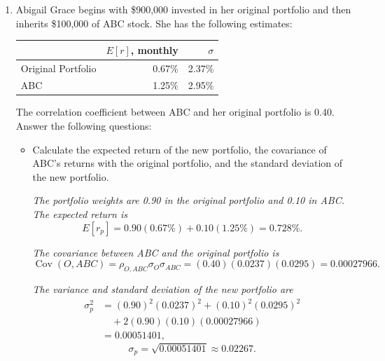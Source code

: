 \documentclass[11pt]{article}
\theoremstyle{definition}
\begin{document}
    \begin{shaded}

        \begin{enumerate}
            \item Abigail Grace begins with \$900,000 invested in her original
            portfolio and then inherits \$100,000 of ABC stock. She has the
            following estimates:
            
            \begin{center}
            \begin{tabular}{lrr}
            \toprule
            & $E[r]$, monthly & $\sigma$ \\
            \midrule
            Original Portfolio & 0.67\% & 2.37\% \\
            ABC                 & 1.25\% & 2.95\% \\
            \bottomrule
            \end{tabular}
            \end{center}
            
            The correlation coefficient between ABC and her original portfolio is
            0.40. Answer the following questions:
            
            \begin{itemize}
            
                \item Calculate the expected return of the new portfolio, the
                covariance of ABC's returns with the original portfolio, and the
                standard deviation of the new portfolio.
            
                \textit{The portfolio weights are 0.90 in the original portfolio
                and 0.10 in ABC. The expected return is}
                \[
                    E[r_p]
                    =0.90(0.67\%)+0.10(1.25\%)
                    =0.728\%.
                \]
            
                \textit{The covariance between ABC and the original portfolio is}
                \[
                    \operatorname{Cov}(O,ABC)
                    =\rho_{O,ABC}\sigma_O\sigma_{ABC}
                    =(0.40)(0.0237)(0.0295)
                    =0.00027966.
                \]
            
                \textit{The variance and standard deviation of the new portfolio are}
                \[
                \begin{aligned}
                    \sigma_p^2
                    &=(0.90)^2(0.0237)^2
                    +(0.10)^2(0.0295)^2 \\
                    &\quad
                    +2(0.90)(0.10)(0.00027966)\\
                    &=0.00051401,
                \end{aligned}
                \]
                \[
                    \sigma_p=\sqrt{0.00051401}
                    \approx 0.02267.
                \]
            

\end{itemize}
\end{enumerate}
\end{shaded}
\end{document}
